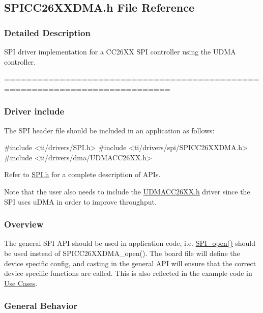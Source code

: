 \subsection{S\+P\+I\+C\+C26\+X\+X\+D\+M\+A.\+h File Reference}
\label{_s_p_i_c_c26_x_x_d_m_a_8h}


\subsubsection{Detailed Description}
S\+P\+I driver implementation for a C\+C26\+X\+X S\+P\+I controller using the U\+D\+M\+A controller. 

============================================================================

\subsubsection*{Driver include}

The S\+P\+I header file should be included in an application as follows\+: 
\begin{DoxyCode}
\textcolor{preprocessor}{#include <ti/drivers/SPI.h>}
\textcolor{preprocessor}{#include <ti/drivers/spi/SPICC26XXDMA.h>}
\textcolor{preprocessor}{#include <ti/drivers/dma/UDMACC26XX.h>}
\end{DoxyCode}


Refer to \hyperlink{_s_p_i_8h}{S\+P\+I.\+h} for a complete description of A\+P\+Is.

Note that the user also needs to include the \hyperlink{_u_d_m_a_c_c26_x_x_8h}{U\+D\+M\+A\+C\+C26\+X\+X.\+h} driver since the S\+P\+I uses u\+D\+M\+A in order to improve throughput.

\subsubsection*{Overview}

The general S\+P\+I A\+P\+I should be used in application code, i.\+e. \hyperlink{_s_p_i_8h_a62cfe494cb1df47cd602e8747e894fd1}{S\+P\+I\+\_\+open()} should be used instead of S\+P\+I\+C\+C26\+X\+X\+D\+M\+A\+\_\+open(). The board file will define the device specific config, and casting in the general A\+P\+I will ensure that the correct device specific functions are called. This is also reflected in the example code in \hyperlink{_s_p_i_c_c26_x_x_d_m_a_8h_USE_CASES_SPI}{Use Cases}.

\subsubsection*{General Behavior}

